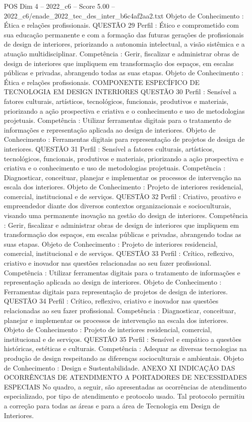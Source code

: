 \begin{textsample}{POS Dim 4 – 2022\_c6 – Score 5.00 – 2022\_c6/enade\_2022\_tec\_des\_inter\_b6c4af2aa2.txt}
Objeto de Conhecimento : Ética e relações profissionais.
QUESTÃO 29 Perfil : Ético e comprometido com sua educação permanente e com a formação das futuras gerações de profissionais de design de interiores, priorizando a autonomia intelectual, a visão sistêmica e a atuação multidisciplinar.
Competência : Gerir, fiscalizar e administrar obras de design de interiores que impliquem em transformação dos espaços, em escalas públicas e privadas, abrangendo todas as suas etapas.
Objeto de Conhecimento : Ética e relações profissionais.
COMPONENTE ESPECÍFICO DE TECNOLOGIA EM DESIGN INTERIORES QUESTÃO 30 Perfil : Sensível a fatores culturais, artísticos, tecnológicos, funcionais, produtivos e materiais, priorizando a ação prospectiva e criativa e o conhecimento e uso de metodologias projetuais.
Competência : Utilizar ferramentas digitais para o tratamento de informações e representação aplicada ao design de interiores.
Objeto de Conhecimento : Ferramentas digitais para representação de projetos de design de interiores.
QUESTÃO 31 Perfil : Sensível a fatores culturais, artísticos, tecnológicos, funcionais, produtivos e materiais, priorizando a ação prospectiva e criativa e o conhecimento e uso de metodologias projetuais.
Competência : Diagnosticar, conceituar, planejar e implementar os processos de intervenção na escala dos interiores.
Objeto de Conhecimento : Projeto de interiores residencial, comercial, institucional e de serviços.
QUESTÃO 32 Perfil : Criativo, proativo e empreendedor diante dos diversos contextos organizacionais e socioculturais, visando uma permanente inovação na gestão do design de interiores.
Competência : Gerir, fiscalizar e administrar obras de design de interiores que impliquem em transformação dos espaços, em escalas públicas e privadas, abrangendo todas as suas etapas.
Objeto de Conhecimento : Projeto de interiores residencial, comercial, institucional e de serviços.
QUESTÃO 33 Perfil : Crítico, reflexivo, criativo e inovador nas questões relacionadas ao seu fazer profissional.
Competência : Utilizar ferramentas digitais para o tratamento de informações e representação aplicada ao design de interiores.
Objeto de Conhecimento : Ferramentas digitais para representação de projetos de design de interiores.
QUESTÃO 34 Perfil : Crítico, reflexivo, criativo e inovador nas questões relacionadas ao seu fazer profissional.
Competência : Diagnosticar, conceituar, planejar e implementar os processos de intervenção na escala dos interiores.
Objeto de Conhecimento : Projeto de interiores residencial, comercial, institucional e de serviços.
QUESTÃO 35 Perfil : Sensível e empático a questões históricas, estéticas e culturais.
Competência : Adequar as diversas tecnologias na produção de design respeitando as diferenças socioculturais e ambientais.
Objeto de Conhecimento : Design e Sustentabilidade.
ANEXO XI INDICAÇÃO DAS OCORRÊNCIAS DE ATENDIMENTO A PORTADORES DE NECESSIDADES ESPECIAIS No quadro, a seguir, são apresentadas as ocorrências de atendimento especializado, por tipo de atendimento e protocolo usado.
Tal protocolo permitiu a correção para todas as áreas e para a área de Tecnologia em Design de Interiores.


\end{textsample}
